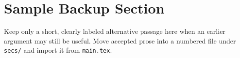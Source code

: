 \section{Sample Backup Section}
\label{sec:sample-backup}

Keep only a short, clearly labeled alternative passage here when an earlier argument may still be useful.
Move accepted prose into a numbered file under \texttt{secs/} and import it from \texttt{main.tex}.
